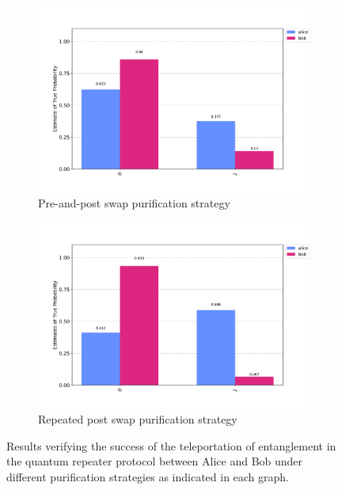 \documentclass[11pt]{article}
\begin{document}
\begin{figure}[ht]
\begin{subfigure}[b]{0.45\textwidth}
    \includegraphics[width=\linewidth]{figures/dps_verification_pre_and_post_swap.jpg}
    \caption{Pre-and-post swap purification strategy}
    \label{fig:deutsch_purification_strategy_verification_results_pre_post_swap}
  \end{subfigure}
  \begin{subfigure}[b]{0.45\textwidth}
    \includegraphics[width=\linewidth]{figures/dps_verification_repeated_post_swap.jpg}
    \caption{Repeated post swap purification strategy}
    \label{fig:deutsch_purification_strategy_verification_results_repeated_post_swap}
  \end{subfigure}
  \caption[Verification of teleportation in quantum Repeater protocol]{Results verifying the success of the teleportation of entanglement in the quantum repeater protocol between Alice and Bob under different purification strategies as indicated in each graph.}
  \label{fig:deutsch_purification_strategy_verification_results}
\end{figure}
\end{document}
